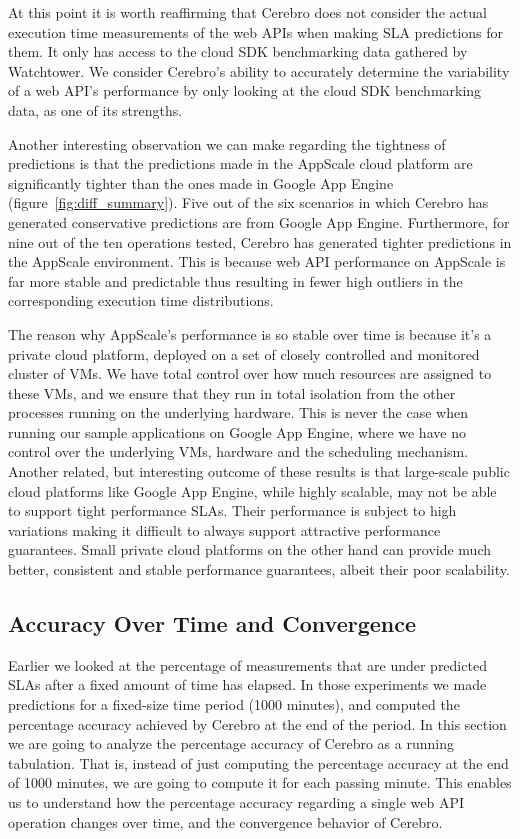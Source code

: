 At this point it is worth reaffirming that Cerebro does not consider the actual execution time measurements of the web APIs when
making SLA predictions for them. It only has access to the cloud SDK benchmarking data gathered by Watchtower. We consider
Cerebro's ability to accurately determine the variability of a web API's performance by only looking at the cloud SDK
benchmarking data, as one of its strengths.

Another interesting observation we can make regarding the tightness of predictions is that 
the predictions made in the AppScale cloud platform are significantly tighter than the ones made in Google App Engine (figure~\ref{fig:diff_summary}). 
Five out of the six scenarios in which Cerebro has generated conservative predictions are from Google App Engine. Furthermore,
for nine out of the ten operations tested, Cerebro has generated tighter predictions in the AppScale environment. This is 
because web API performance on AppScale is far more stable and predictable thus resulting in fewer high outliers in the corresponding
execution time distributions.

The reason why AppScale's performance is so stable over time is because it's a private cloud platform, deployed on a set of closely controlled 
and monitored cluster of VMs. We have total control
over how much resources are assigned to these VMs, and we ensure that they run in total isolation from the other processes running on the underlying hardware.
This is never the case when running our sample applications on Google App Engine, where we have no control over the underlying VMs, hardware and the
scheduling mechanism. Another related, but interesting outcome of these results is that large-scale public cloud platforms like Google App Engine, while
highly scalable, may not be able to support tight performance SLAs. Their performance is subject to high variations making it difficult to always support attractive
performance guarantees. Small private cloud platforms on the other hand can provide much better, consistent and stable performance guarantees, albeit their
poor scalability. %

\subsection{Accuracy Over Time and Convergence}
Earlier we looked at the percentage of measurements that are under predicted SLAs after a fixed amount of time has elapsed.
In those experiments we made predictions for a fixed-size time period (1000 minutes), 
and computed the percentage accuracy achieved by Cerebro at the end of the period.
In this section we are going to analyze the percentage accuracy of Cerebro as a running tabulation. That is, instead of just
computing the percentage accuracy at the end of 1000 minutes, we are going to compute it for each passing minute. This enables us to
understand how the percentage accuracy regarding a single web API operation changes over time, and the convergence
behavior of Cerebro.

